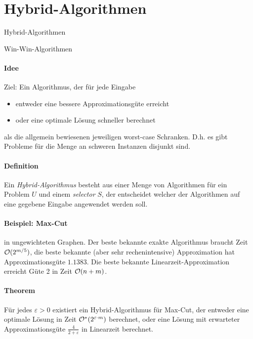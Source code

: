 \section{Hybrid-Algorithmen}

\begin{takeaway}
    \item Hybrid-Algorithmen
    \item Win-Win-Algorithmen
\end{takeaway}

\paragraph{Idee}
Ziel: Ein Algorithmus, der für jede Eingabe
\begin{itemize}
    \item entweder eine bessere Approximationsgüte erreicht
    \item oder eine optimale Lösung schneller berechnet
\end{itemize}
als die allgemein bewiesenen jeweiligen worst-case Schranken.
D.h. es gibt Probleme für die Menge an schweren Instanzen disjunkt sind.

\paragraph{Definition}
Ein \emph{Hybrid-Algorithmus} besteht aus einer Menge von Algorithmen für ein Problem $U$
und einem \emph{selector} $S$, der entscheidet welcher der Algorithmen auf eine gegebene Eingabe
angewendet werden soll.


\paragraph{Beispiel: Max-Cut} in ungewichteten Graphen.
Der beste bekannte exakte Algorithmus braucht Zeit $\mathcal{O}(2^{m/5})$,
die beste bekannte (aber sehr rechenintensive) Approximation hat Approximationsgüte $1.1383$.
Die beste bekannte Linearzeit-Approximation erreicht Güte 2 in Zeit $\mathcal{O}(n+m)$.

\paragraph{Theorem}
Für jedes $\varepsilon > 0$ existiert ein Hybrid-Algorithmus für Max-Cut, der
entweder eine optimale Lösung in Zeit $\mathcal{O}^*(2^{\varepsilon \cdot m})$ berechnet,
oder eine Lösung mit erwarteter Approximationsgüte $\frac{4}{2+\varepsilon}$ in Linearzeit berechnet.

